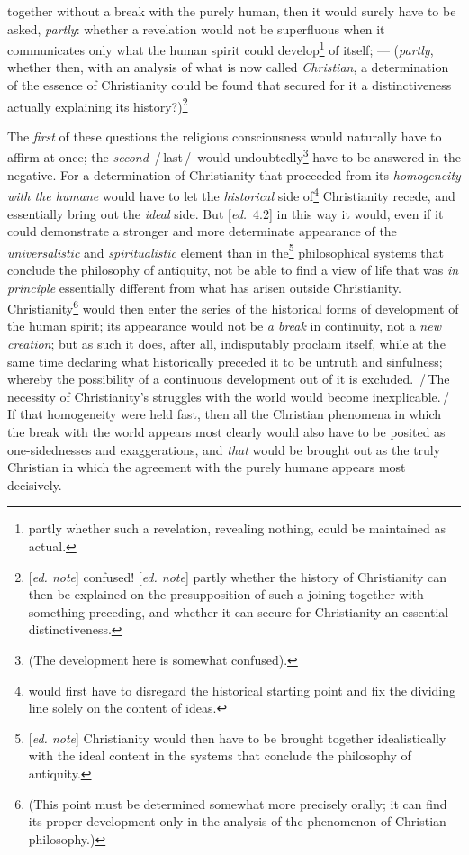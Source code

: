 \documentclass[12pt,a4paper,openany]{book}
\newcommand{\kpage}[1]{\marginnote{\footnotesize\textit{[#1]}}}
\newcommand{\ed}[1]{{\small[\textit{ed.}\ #1]}}
\newcommand{\ednote}[1]{{\small[\textit{ed. note}]}}
\newcommand{\ins}[1]{\,/\,#1\,/\,}
\begin{document}
together without a break with the purely human, then it would surely have to
be asked, \emph{partly}: whether a revelation would not be superfluous
when it communicates only what the human spirit
could develop\footnote[12]{partly whether such a revelation, revealing nothing, could be maintained as
actual.}
of itself; --- (\emph{partly}, whether then, with an analysis
of what is now called \emph{Christian}, a determination of the
essence of Christianity could be found that secured for it a distinctiveness actually
explaining its history?)\footnote[13]{\ednote{} confused! \ednote{} partly whether the history of Christianity can then be explained
on the presupposition of such a joining together with something preceding, and
whether it can secure for Christianity an essential distinctiveness.}

The \emph{first} of these questions the religious consciousness would
naturally have to affirm at once; the \emph{second} \ins{last} would undoubtedly\footnote[14]{(The development here is somewhat confused).} have to be answered
in the negative. For a determination of Christianity
that proceeded from its \emph{homogeneity with the humane} would have to let the \emph{historical}
side of\footnote[15]{would first have to disregard the historical starting point and fix
the dividing line solely on the content of ideas.}
Christianity recede, and essentially bring out
the \emph{ideal} side. But \ed{4.2} in this way it would, even if it
could demonstrate a stronger and more determinate appearance of the
\kpage{87}\emph{universalistic} and \emph{spiritualistic} element than in the\footnote[16]{\ednote{} Christianity
would then have to be brought together idealistically with the ideal content in the systems that conclude
the philosophy of antiquity.}
philosophical systems
that conclude the philosophy of antiquity, not be able to find a
view of life that was \emph{in principle} essentially different from what has
arisen outside Christianity. Christianity\footnote[17]{(This point must be determined somewhat more precisely orally; it can find its proper
development only in the analysis of the phenomenon of Christian philosophy.)}
would then
enter the series of the historical forms of development of the human spirit;
its appearance would not be \emph{a break} in continuity,
not a \emph{new creation}; but as such it does, after all,
indisputably proclaim itself, while at the same time declaring what historically preceded it
to be untruth and sinfulness; whereby the possibility of a
continuous development out of it is excluded. \ins{The necessity of
Christianity's struggles with the world would become inexplicable.}
If that homogeneity were held fast, then all the Christian phenomena
in which the break with the world appears most clearly would also have to
be posited as one-sidednesses and exaggerations, and \emph{that} would be brought out
as the truly Christian in which the agreement with the purely
humane appears most decisively.
\end{document}
